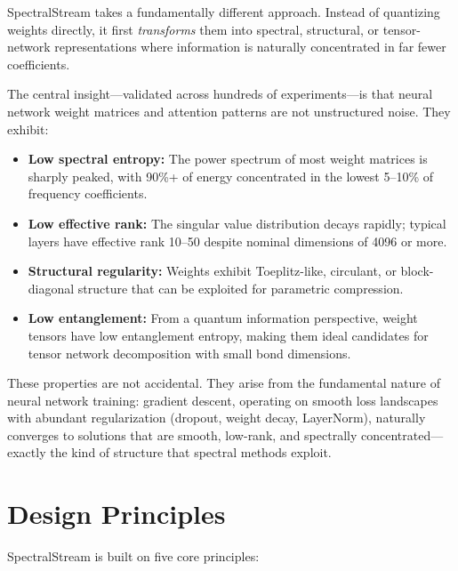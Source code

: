 \documentclass[11pt,a4paper,openright]{book}
\begin{document}
SpectralStream takes a fundamentally different approach. Instead of quantizing weights directly, it first \emph{transforms} them into spectral, structural, or tensor-network representations where information is naturally concentrated in far fewer coefficients.

The central insight---validated across hundreds of experiments---is that neural network weight matrices and attention patterns are not unstructured noise. They exhibit:

\begin{itemize}
	\item \textbf{Low spectral entropy:} The power spectrum of most weight matrices is sharply peaked, with 90\%+ of energy concentrated in the lowest 5--10\% of frequency coefficients.
	\item \textbf{Low effective rank:} The singular value distribution decays rapidly; typical layers have effective rank 10--50 despite nominal dimensions of 4096 or more.
	\item \textbf{Structural regularity:} Weights exhibit Toeplitz-like, circulant, or block-diagonal structure that can be exploited for parametric compression.
	\item \textbf{Low entanglement:} From a quantum information perspective, weight tensors have low entanglement entropy, making them ideal candidates for tensor network decomposition with small bond dimensions.
\end{itemize}

These properties are not accidental. They arise from the fundamental nature of neural network training: gradient descent, operating on smooth loss landscapes with abundant regularization (dropout, weight decay, LayerNorm), naturally converges to solutions that are smooth, low-rank, and spectrally concentrated---exactly the kind of structure that spectral methods exploit.

\section{Design Principles}

SpectralStream is built on five core principles:
\end{document}
